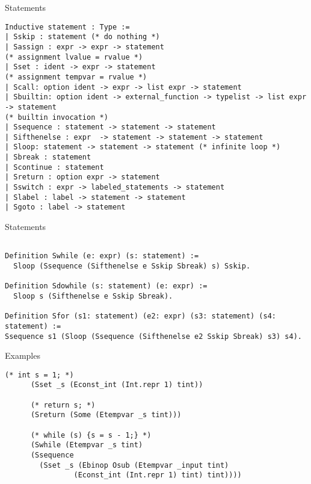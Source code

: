 \documentclass{beamer}
\begin{document}
\begin{frame}[fragile]{Statements}

  \begin{lstlisting}[language=Coq]
Inductive statement : Type :=
| Sskip : statement (* do nothing *)
| Sassign : expr -> expr -> statement
(* assignment lvalue = rvalue *)
| Sset : ident -> expr -> statement
(* assignment tempvar = rvalue *)
| Scall: option ident -> expr -> list expr -> statement
| Sbuiltin: option ident -> external_function -> typelist -> list expr -> statement
(* builtin invocation *)
| Ssequence : statement -> statement -> statement
| Sifthenelse : expr  -> statement -> statement -> statement
| Sloop: statement -> statement -> statement (* infinite loop *)
| Sbreak : statement
| Scontinue : statement
| Sreturn : option expr -> statement
| Sswitch : expr -> labeled_statements -> statement
| Slabel : label -> statement -> statement
| Sgoto : label -> statement

  \end{lstlisting}
  


\end{frame}



\begin{frame}[fragile]{Statements}

  \begin{lstlisting}[language=Coq]
    
Definition Swhile (e: expr) (s: statement) :=
  Sloop (Ssequence (Sifthenelse e Sskip Sbreak) s) Sskip.

Definition Sdowhile (s: statement) (e: expr) :=
  Sloop s (Sifthenelse e Sskip Sbreak).

Definition Sfor (s1: statement) (e2: expr) (s3: statement) (s4: statement) :=
Ssequence s1 (Sloop (Ssequence (Sifthenelse e2 Sskip Sbreak) s3) s4).

  \end{lstlisting}
  


\end{frame}


\begin{frame}[fragile]{Examples}

  \begin{lstlisting}[language=Coq]
     (* int s = 1; *)
      (Sset _s (Econst_int (Int.repr 1) tint))

      (* return s; *)
      (Sreturn (Some (Etempvar _s tint)))

      (* while (s) {s = s - 1;} *)
      (Swhile (Etempvar _s tint) 
      (Ssequence  
        (Sset _s (Ebinop Osub (Etempvar _input tint)
                (Econst_int (Int.repr 1) tint) tint))))


  \end{lstlisting}
  


\end{frame}
\end{document}
